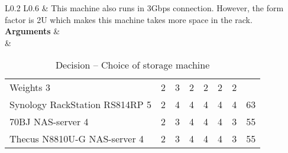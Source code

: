 \begin{table}[H]
\begin{tabular}{L{0.2\textwidth} L{0.6\textwidth}}
		& This machine also runs in 3Gbps connection. However, the form factor is 2U which makes this machine takes more space in the rack.\\
		\midrule
		\textbf{Arguments}      & \\
		&   \begin{tabular}{l|llllll|l}
		                                  & \rot{Reliability} & \rot{Performance} & \rot{Interoperability} & \rot{Security} & \rot{Scalability} & \rot{Cost} & \rot{\textbf{Score}} \\ \hline
		Weights                         3 & 2 & 3 & 2 & 2 & 2 & 2 \\ \hline
		Synology RackStation RS814RP    5 & 2                 & 4                 & 4                      & 4              & 4                 & 4          & 63                   \\ 
		70BJ NAS-server                 4 & 2                 & 3                 & 4                      & 4              & 4                 & 3          & 55                   \\
		Thecus N8810U-G NAS-server      4 & 2                 & 3                 & 4                      & 4              & 4                 & 3          & 55                   \\
	\end{tabular} \\
	\\ \bottomrule
	\end{tabular}
	\caption{Decision -- Choice of storage machine}
	\label{table:database-selection}
\end{table}

